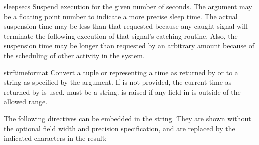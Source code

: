 \begin{funcdesc}{sleep}{secs}
Suspend execution for the given number of seconds.  The argument may
be a floating point number to indicate a more precise sleep time.
The actual suspension time may be less than that requested because any
caught signal will terminate the  following
execution of that signal's catching routine.  Also, the suspension
time may be longer than requested by an arbitrary amount because of
the scheduling of other activity in the system.
\end{funcdesc}

\begin{funcdesc}{strftime}{format}
Convert a tuple or  representing a time as returned
by  or  to a string as
specified by the  argument.  If  is not
provided, the current time as returned by  is
used.   must be a string.   is raised
if any field in  is outside of the allowed range.


The following directives can be embedded in the  string.
They are shown without the optional field width and precision
specification, and are replaced by the indicated characters in the
 result:


\end{funcdesc}
